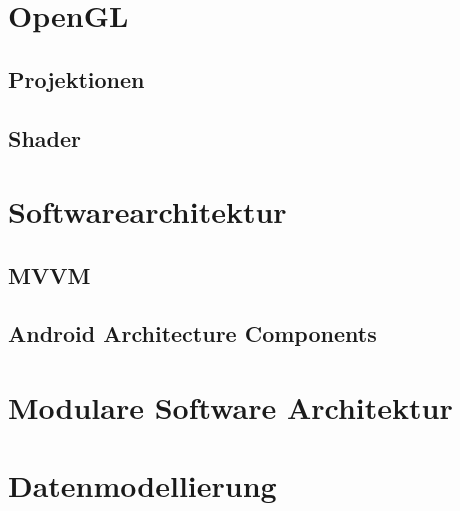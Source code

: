 
\section{OpenGL}
\subsection{Projektionen}
\subsection{Shader}

\section{Softwarearchitektur}
\subsection{MVVM}
\subsection{Android Architecture Components}

\section{Modulare Software Architektur}

\section{Datenmodellierung}